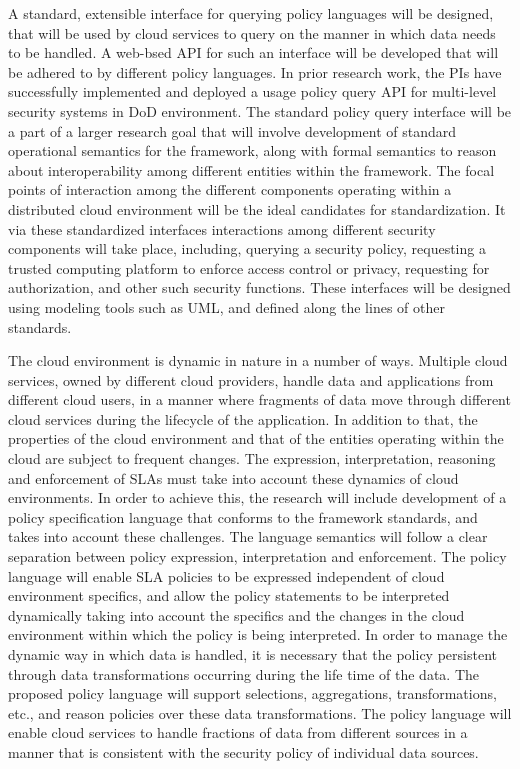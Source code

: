 \documentclass[10pt, conference, compsocconf]{IEEEtran}
\begin{document}
A standard, extensible interface for querying policy languages will be designed, that will be used by cloud services to query on the manner in which data needs to be handled. A web-bsed API for such an interface will be developed that will be adhered to by different policy languages. In prior research work, the PIs have successfully implemented and deployed a usage policy query API for multi-level security systems in DoD environment. The standard policy query interface will be a part of a larger research goal that will involve development of standard operational semantics for the framework, along with formal semantics to reason about interoperability among different entities within the framework. The focal points of interaction among the different components operating within a distributed cloud environment will be the ideal candidates for standardization. It via these standardized interfaces interactions among different security components will take place, including, querying a security policy, requesting a trusted computing platform to enforce access control or privacy, requesting for authorization, and other such security functions. These interfaces will be designed using modeling tools such as UML, and defined along the lines of other standards. 

The cloud environment is dynamic in nature in a number of ways. Multiple cloud services, owned by different cloud providers, handle data and applications from different cloud users, in a manner where fragments of data move through different cloud services during the lifecycle of the application. In addition to that, the properties of the cloud environment and that of the entities operating within the cloud are subject to frequent changes. The expression, interpretation, reasoning and enforcement of SLAs must take into account these dynamics of cloud environments.  In order to achieve this, the research will include development of a policy specification language that conforms to the framework standards, and takes into account these challenges. The language semantics will follow a clear separation between policy expression, interpretation and enforcement. The policy language will enable SLA policies to be expressed independent of cloud environment specifics, and allow the policy statements to be interpreted dynamically taking into account the specifics and the changes in the cloud environment within which the policy is being interpreted.  In order to manage the dynamic way in which data is handled, it is necessary that the policy persistent through data transformations occurring during the life time of the data. The proposed policy language will support selections, aggregations, transformations, etc., and reason policies over these data transformations. The policy language will enable cloud services to handle fractions of data from different sources in a manner that is consistent with the security policy of individual data sources. 
\end{document}
